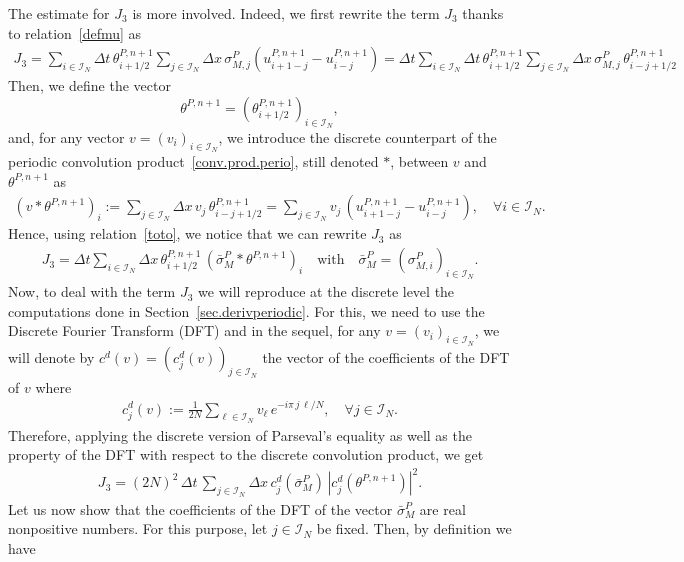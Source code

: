 \documentclass[11pt]{amsart}
\newcommand{\I}{\mathcal{I}_N}
\begin{document}
The estimate for $J_3$ is more involved. Indeed, we first rewrite the term $J_3$ thanks to relation~\eqref{defmu} as
\begin{align}\label{toto}
J_3 =  \sum_{i \in \I} \Delta t \,\theta^{P,n+1}_{i+1/2} \sum_{j \in \I} \Delta x \, \sigma^P_{M,j} \left( u^{P,n+1}_{i+1-j} - u^{P,n+1}_{i-j} \right) = \Delta t  \sum_{i \in \I} \Delta t \,\theta^{P,n+1}_{i+1/2} \sum_{j \in \I} \Delta x \, \sigma^P_{M,j} \, \theta^{P,n+1}_{i-j+1/2}
\end{align}
Then, we define the vector
\[
\theta^{P,n+1} = \left(\theta^{P,n+1}_{i+1/2}\right)_{i\in\I},
\]
and, for any vector $v=(v_i)_{i\in\I}$, we introduce the discrete counterpart of the periodic convolution product~\eqref{conv.prod.perio}, still denoted $\ast$, between $v$ and $\theta^{P,n+1}$ as
\begin{align*}
    \left(v \ast \theta^{P,n+1}\right)_i := \sum_{j \in \I} \Delta x \, v_j \, \theta^{P,n+1}_{i-j+1/2} = \sum_{j \in \I}  v_j \, \left(u^{P,n+1}_{i+1-j}-u^{P,n+1}_{i-j}\right), \quad \forall i \in \I.
\end{align*}
Hence, using relation~\eqref{toto}, we notice that we can rewrite $J_3$ as
\begin{align*}
    J_3 = \Delta t \sum_{i\in\I} \Delta x \, \theta^{P,n+1}_{i+1/2} \, \left( \bar{\sigma}_M^P \ast \theta^{P,n+1}\right)_i 
  \quad\mbox{with} \quad    \bar{\sigma}_M^P= (\sigma_{M,i}^P)_{i\in\I}. 
\end{align*}
Now, to deal with the term $J_3$ we will reproduce at the discrete level the computations done in Section~\ref{sec.derivperiodic}. For this, we need to use the Discrete Fourier Transform (DFT) and in the sequel, for any $v = (v_i)_{i\in \I}$, we will denote by $c^d(v) = (c^d_j(v))_{j\in\I}$ the vector of the coefficients of the DFT of $v$ where
\begin{align*}
    c^d_j(v) := \frac{1}{2N} \sum_{\ell \in \I} v_\ell \, e^{-i\pi \, j \, \ell/N}, \quad \forall j \in \I.
\end{align*}
Therefore, applying the discrete version of Parseval's equality as well as the property of the DFT with respect to the discrete convolution product, we get
\begin{align*}
    J_3 = (2N)^2 \, \Delta t  \, \sum_{j \in \I} \Delta x \, c^d_j\left(\bar{\sigma}_M^P\right) \, \left|c^d_j\left(\theta^{P,n+1}\right)\right|^2.
\end{align*}
Let us now show that the coefficients of the DFT of the vector $\bar{\sigma}_M^P$ are real nonpositive numbers. For this purpose, let $j\in\I$ be fixed. Then, by definition we have
\end{document}
